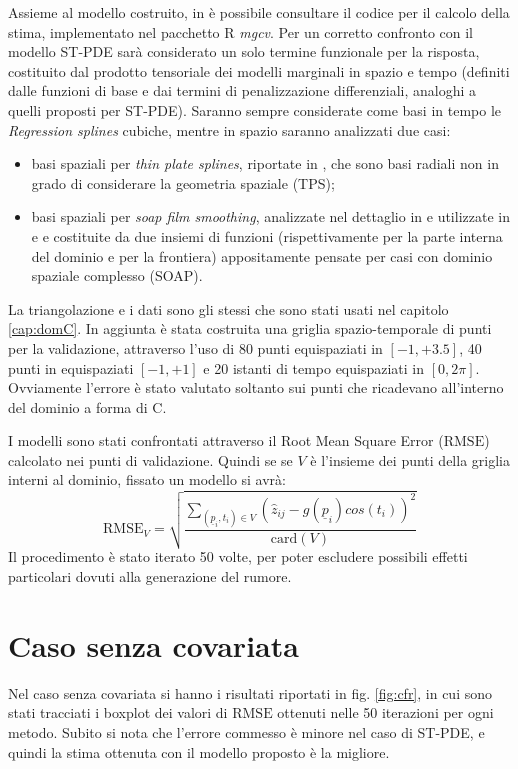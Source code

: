 \documentclass[a4paper,11pt,twoside,openright]{book}							%
\begin{document}
Assieme al modello costruito, in \cite{art:augustin} è possibile consultare il codice per il calcolo della stima, implementato nel pacchetto R \textit{mgcv}. Per un corretto confronto con il modello ST-PDE sarà considerato un solo termine funzionale per la risposta, costituito dal prodotto tensoriale dei modelli marginali in spazio e tempo (definiti dalle funzioni di base e dai termini di penalizzazione differenziali, analoghi a quelli proposti per ST-PDE). Saranno sempre considerate come basi in tempo le \textit{Regression splines} cubiche, mentre in spazio saranno
\newpage
\noindent analizzati due casi:
\begin{itemize}
\item basi spaziali per \textit{thin plate splines}, riportate in \cite{package:mgcv4}, che sono basi radiali non in grado di considerare la geometria spaziale (TPS);
\item basi spaziali per \textit{soap film smoothing}, analizzate nel dettaglio in \cite{art:wood} e utilizzate in \cite{art:marra} e \cite{art:augustin} e costituite da due insiemi di funzioni (rispettivamente per la parte interna del dominio e per la frontiera) appositamente pensate per casi con dominio spaziale complesso (SOAP).
\end{itemize}

La triangolazione e i dati sono gli stessi che sono stati usati nel capitolo \ref{cap:domC}. In aggiunta è stata costruita una griglia spazio-temporale di punti per la validazione, attraverso l'uso di 80 punti equispaziati in $[-1,+3.5]$, 40 punti in equispaziati $[-1,+1]$ e 20 istanti di tempo equispaziati in $[0,2\pi]$. Ovviamente l'errore è stato valutato soltanto sui punti che ricadevano all'interno del dominio a forma di C.

I modelli sono stati confrontati attraverso il Root Mean Square Error ($\mathrm{RMSE}$) calcolato nei punti di validazione. Quindi se se $V$ è l'insieme dei punti della griglia interni al dominio, fissato un modello si avrà:
$$
\mathrm{RMSE}_V=\sqrt{\frac{\sum_{(\underline p_i,t_i)\in V} (\hat{z}_{ij}-g(\underline p_i)cos(t_i))^2}{\mathrm{card}(V)}}
$$ 
Il procedimento è stato iterato 50 volte, per poter escludere possibili effetti particolari dovuti alla generazione del rumore.

\newpage
\section{Caso senza covariata}
Nel caso senza covariata si hanno i risultati riportati in fig. \ref{fig:cfr}, in cui sono stati tracciati i boxplot dei valori di $\mathrm{RMSE}$ ottenuti nelle 50 iterazioni per ogni metodo. Subito si nota che l'errore commesso è minore nel caso di ST-PDE, e quindi la stima ottenuta con il modello proposto è la migliore.
\end{document}
